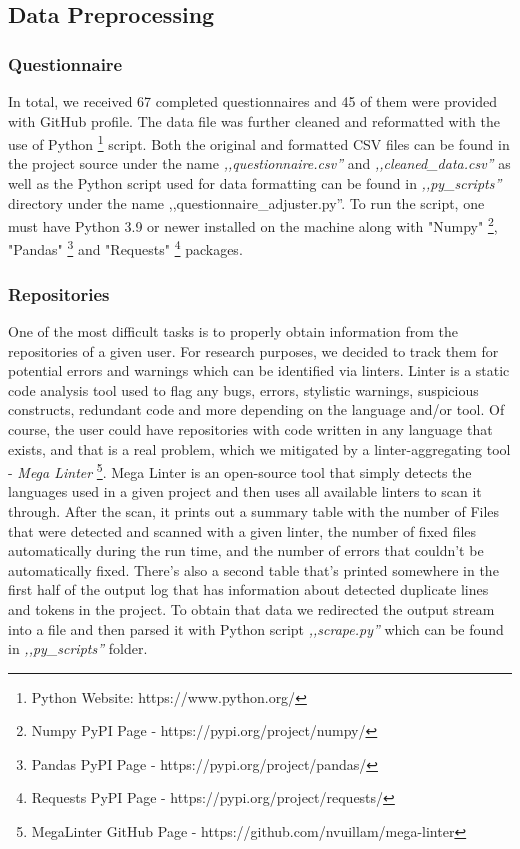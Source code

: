 \subsection{Data Preprocessing}

\subsubsection{Questionnaire}

In total, we received 67 completed questionnaires and 45 of them were provided with GitHub profile. The data file was further cleaned and reformatted with the use of Python \footnote{Python Website: https://www.python.org/} script. Both the original and formatted CSV files can be found in the project source under the name \emph{,,questionnaire.csv''} and \emph{,,cleaned\_data.csv''} as well as the Python script used for data formatting can be found in \emph{,,py\_scripts''} directory under the name ,,questionnaire\_adjuster.py''. To run the script, one must have Python 3.9 or newer installed on the machine along with "Numpy" \footnote{Numpy PyPI Page - https://pypi.org/project/numpy/}, "Pandas" \footnote{Pandas PyPI Page - https://pypi.org/project/pandas/} and "Requests" \footnote{Requests PyPI Page - https://pypi.org/project/requests/} packages.

\subsubsection{Repositories}

One of the most difficult tasks is to properly obtain information from the repositories of a given user. For research purposes, we decided to track them for potential errors and warnings which can be identified via linters. Linter is a static code analysis tool used to flag any bugs, errors, stylistic warnings, suspicious constructs, redundant code and more depending on the language and/or tool. Of course, the user could have repositories with code written in any language that exists, and that is a real problem, which we mitigated by a linter-aggregating tool - \emph{Mega Linter} \footnote{MegaLinter GitHub Page - https://github.com/nvuillam/mega-linter}. Mega Linter is an open-source tool that simply detects the languages used in a given project and then uses all available linters to scan it through. After the scan, it prints out a summary table with the number of Files that were detected and scanned with a given linter, the number of fixed files automatically during the run time, and the number of errors that couldn't be automatically fixed. There's also a second table that's printed somewhere in the first half of the output log that has information about detected duplicate lines and tokens in the project. To obtain that data we redirected the output stream into a file and then parsed it with Python script \emph{,,scrape.py''} which can be found in \emph{,,py\_scripts''} folder.

